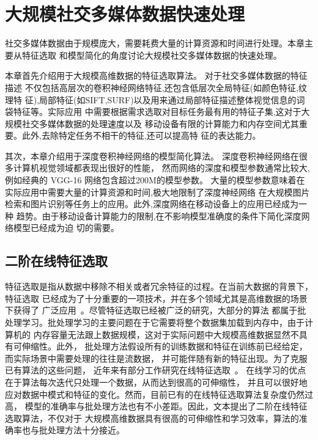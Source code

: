\chapter{大规模社交多媒体数据快速处理}
社交多媒体数据由于规模庞大，需要耗费大量的计算资源和时间进行处理。本章主要从特征选取
和模型简化的角度讨论大规模社交多媒体数据的快速处理。

本章首先介绍用于大规模高维数据的特征选取算法。 对于社交多媒体数据的特征描述
不仅包括高层次的卷积神经网络特征,还包含低层次全局特征(如颜色特征,纹理特
征),局部特征(如SIFT,SURF)以及用来通过局部特征描述整体视觉信息的词袋特征等。实际应用
中需要根据需求选取对目标任务最有用的特征子集,这对于大规模社交多媒体数据的处理速度以及
移动设备有限的计算能力和内存空间尤其重要。此外,去除特定任务不相干的特征,还可以提高特
征的表达能力。

其次，本章介绍用于深度卷积神经网络的模型简化算法。
深度卷积神经网络在很多计算机视觉领域都表现出很好的性能，
然而网络的深度和模型参数通常比较大,例如经典的 VGG-16 网络包含超过200M的模型参数。
大量的模型参数意味着在实际应用中需要大量的计算资源和时间,极大地限制了深度神经网络
在大规模图片检索和图片识别等任务上的应用。此外,深度网络在移动设备上的应用已经成为一种
趋势。由于移动设备计算能力的限制,在不影响模型准确度的条件下简化深度网络模型已经成为迫
切的需要。

\section{二阶在线特征选取}
特征选取是指从数据中移除不相关或者冗余特征的过程。在当前大数据的背景下，特征选取
已经成为了十分重要的一项技术，并在多个领域尤其是高维数据的场景下获得了
广泛应用~\cite{Bolon015RAE,Zhai14EBD}。尽管特征选取已经被广泛的研究，大部分的算法
都属于批处理学习。批处理学习的主要问题在于它需要将整个数据集加载到内存中，由于计算机的
内存容量无法跟上数据规模，这对于实际问题中大规模高维数据显然不具有可伸缩性。此外，
批处理方法假设所有的训练数据和特征在训练前已经给定，而实际场景中需要处理的往往是流数据，
并可能伴随有新的特征出现。为了克服已有算法的这些问题，
近年来有部分工作研究在线特征选取~\cite{wang2014online,wu2010online,yang2013efficient}。
在线学习的优点在于算法每次迭代只处理一个数据，从而达到很高的可伸缩性，
并且可以很好地应对数据中模式和特征的变化。然而，目前已有的在线特征选取算法复杂度仍然过高，
模型的准确率与批处理方法也有不小差距。因此，文本提出了二阶在线特征选取算法，不仅对于
大规模高维数据具有很高的可伸缩性和学习效率，算法的准确率也与批处理方法十分接近。

